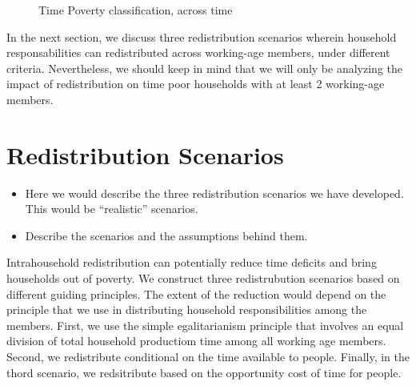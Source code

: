 \documentclass[
  11pt,
]{article}
\begin{document}
\begin{figure}


\caption{\label{fig-composition}Time Poverty classification, across
time}

\end{figure}%

In the next section, we discuss three redistribution scenarios wherein
household responsabilities can redistributed across working-age members,
under different criteria. Nevertheless, we should keep in mind that we
will only be analyzing the impact of redistribution on time poor
households with at least 2 working-age members.

\section{Redistribution Scenarios}\label{redistribution-scenarios}

\begin{itemize}
\item
  Here we would describe the three redistribution scenarios we have
  developed. This would be ``realistic'' scenarios.
\item
  Describe the scenarios and the assumptions behind them.
\end{itemize}

Intrahousehold redistribution can potentially reduce time deficits and
bring households out of poverty. We construct three redistrubution
scenarios based on different guiding principles. The extent of the
reduction would depend on the principle that we use in distributing
household responsibilities among the members. First, we use the simple
egalitarianism principle that involves an equal division of total
household productiom time among all working age members. Second, we
redistribute conditional on the time available to people. Finally, in
the thord scenario, we redsitribute based on the opportunity cost of
time for people.
\end{document}
